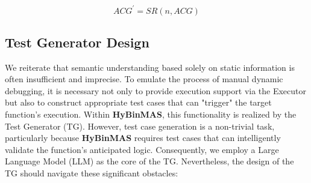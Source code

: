 \documentclass[acmsmall,screen,review,anonymous]{acmart} %
\begin{document}




$$ACG^\prime = SR(n,ACG)$$





\subsection{Test Generator Design}
\label{sec:tg_design}

We reiterate that semantic understanding based solely on static information is often insufficient and imprecise. To emulate the process of manual dynamic debugging, it is necessary not only to provide execution support via the Executor but also to construct appropriate test cases that can "trigger" the target function's execution. Within \textbf{HyBinMAS}, this functionality is realized by the Test Generator (TG). However, test case generation is a non-trivial task, particularly because \textbf{HyBinMAS} requires test cases that can intelligently validate the function's anticipated logic. Consequently, we employ a Large Language Model (LLM) as the core of the TG. Nevertheless, the design of the TG should navigate these significant obstacles:
\end{document}
